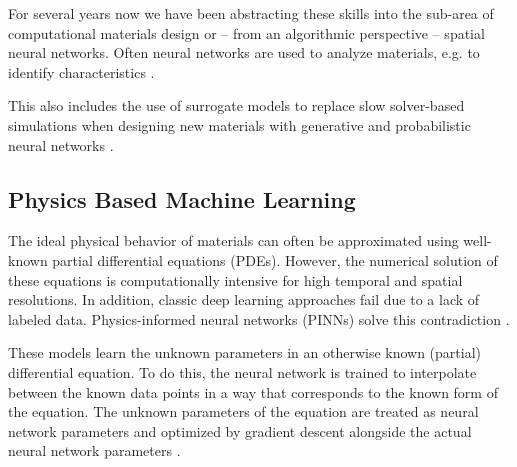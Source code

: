 For several years now we have been abstracting these skills into the sub-area of computational materials design or -- from an algorithmic perspective -- spatial neural networks. Often neural networks are used to analyze materials, e.g. to identify characteristics \cite{Jung-Niggemann,grossmann:2022h}.

This also includes the use of surrogate models to replace slow solver-based simulations when designing new materials \cite{rensmeyer:2023a}
 with generative and probabilistic neural networks \cite{Niggemann:2023b}.

\subsection{Physics Based Machine Learning}
The ideal physical behavior of materials can often be approximated using well-known partial differential equations (PDEs). However, the numerical solution of these equations is computationally intensive for high temporal and spatial resolutions. In addition, classic deep learning approaches fail due to a lack of labeled data. Physics-informed neural networks (PINNs) solve this contradiction \cite{Cai.2021, BPINN, PINNFlow}.

These models learn the unknown parameters in an otherwise known (partial) differential equation. To do this, the neural network is trained to interpolate between the known data points in a way that corresponds to the known form of the equation. The unknown parameters of the equation are treated as neural network parameters and optimized by gradient descent alongside the actual neural network parameters \cite{RAISSI}.


